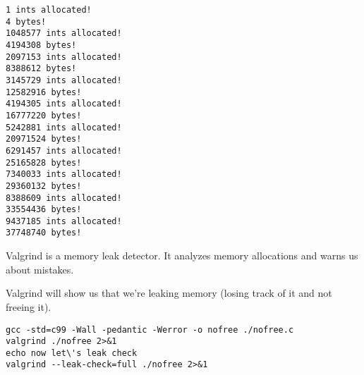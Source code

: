 \documentclass[11pt]{article}
\begin{document}
\begin{verbatim}
1 ints allocated!
4 bytes!
1048577 ints allocated!
4194308 bytes!
2097153 ints allocated!
8388612 bytes!
3145729 ints allocated!
12582916 bytes!
4194305 ints allocated!
16777220 bytes!
5242881 ints allocated!
20971524 bytes!
6291457 ints allocated!
25165828 bytes!
7340033 ints allocated!
29360132 bytes!
8388609 ints allocated!
33554436 bytes!
9437185 ints allocated!
37748740 bytes!
\end{verbatim}

Valgrind is a memory leak detector. It analyzes memory allocations and
warns us about mistakes.

Valgrind will show us that we're leaking memory (losing track of it
and not freeing it).

\begin{verbatim}
gcc -std=c99 -Wall -pedantic -Werror -o nofree ./nofree.c
valgrind ./nofree 2>&1
echo now let\'s leak check
valgrind --leak-check=full ./nofree 2>&1
\end{verbatim}
\end{document}
